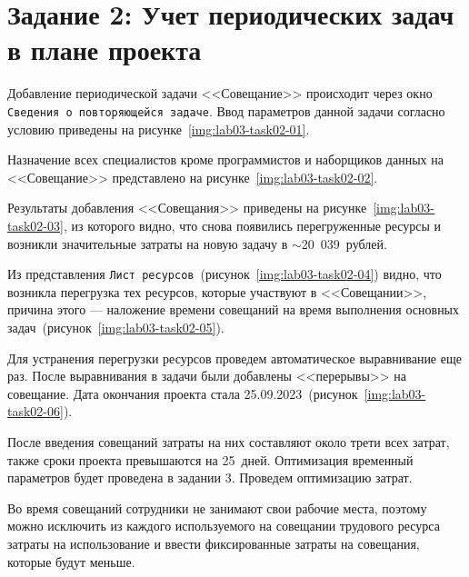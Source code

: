 \section{Задание 2: Учет периодических задач в плане проекта}

Добавление периодической задачи <<Совещание>> происходит через окно
\texttt{Сведения о повторяющейся задаче}. Ввод параметров данной задачи согласно
условию приведены на рисунке~\ref{img:lab03-task02-01}.


Назначение всех специалистов кроме программистов и наборщиков данных на
<<Совещание>> представлено на рисунке~\ref{img:lab03-task02-02}.


Результаты добавления <<Совещания>> приведены на
рисунке~\ref{img:lab03-task02-03}, из которого видно, что снова появились
перегруженные ресурсы и возникли значительные затраты на новую задачу в
$\sim$20~039~рублей.


Из представления \texttt{Лист ресурсов}~(рисунок~\ref{img:lab03-task02-04})
видно, что возникла перегрузка тех ресурсов, которые участвуют в <<Совещании>>,
причина этого --- наложение времени совещаний на время выполнения основных
задач~(рисунок~\ref{img:lab03-task02-05}).



Для устранения перегрузки ресурсов проведем автоматическое выравнивание еще
раз.  После выравнивания в задачи были добавлены <<перерывы>> на совещание.
Дата окончания проекта стала 25.09.2023~(рисунок~\ref{img:lab03-task02-06}).


После введения совещаний затраты на них составляют около трети всех затрат,
также сроки проекта превышаются на 25~дней. Оптимизация временный параметров
будет проведена в задании 3. Проведем оптимизацию затрат.

Во время совещаний сотрудники не занимают свои рабочие места, поэтому можно
исключить из каждого используемого на совещании трудового ресурса затраты на
использование и ввести фиксированные затраты на совещания, которые будут
меньше.

